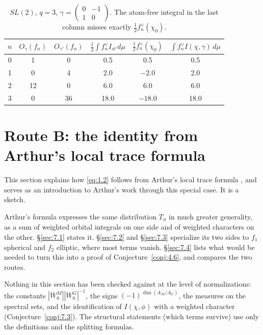 \documentclass[12pt,letterpaper]{article}
\numberwithin{equation}{section}
\theoremstyle{plain}
\theoremstyle{remark}
\theoremstyle{plain}
\theoremstyle{definition}
\theoremstyle{remark}
\theoremstyle{remark}
\begin{document}
\begin{table}[h]
\centering
\begin{tabular}{c|cc|ccc}
\toprule
$n$ & $O_\gamma(f_n)$ & $O_{\gamma'}(f_n)$ & $\frac12\int f_n^\vee I_{st}\,d\mu$ & $\frac12f_n^\vee(\chi_0)$ & $\int f_n^\vee I(\chi,\gamma)\,d\mu$\\
\midrule
0 & 1 & 0 & 0.5 & 0.5 & 0.5\\
1 & 0 & 4 & 2.0 & $-2.0$ & 2.0\\
2 & 12 & 0 & 6.0 & 6.0 & 6.0\\
3 & 0 & 36 & 18.0 & $-18.0$ & 18.0\\
\bottomrule
\end{tabular}
\caption{$SL(2)$, $q=3$, $\gamma=\left(\begin{smallmatrix}0&-1\\1&0\end{smallmatrix}\right)$. The atom-free integral in the last column misses exactly $\frac12f_n^\vee(\chi_0)$.}
\end{table}

\section{Route B: the identity from Arthur's local trace formula}\label{sec:7}

This section explains how \eqref{eq:1.2} follows from Arthur's local trace formula \cite{Ar91}, and serves as an introduction to Arthur's work through this special case. It is a sketch.

Arthur's formula expresses the same distribution $T_\phi$ in much greater generality, as a sum of weighted orbital integrals on one side and of weighted characters on the other. \S\ref{sec:7.1} states it. \S\ref{sec:7.2} and \S\ref{sec:7.3} specialize its two sides to $f_1$ spherical and $f_2$ elliptic, where most terms vanish. \S\ref{sec:7.4} lists what would be needed to turn this into a proof of Conjecture~\ref{conj:4.6}, and compares the two routes.

\begin{rem26}[\S\ref{sec:7}]\label{r:routeB}
Nothing in this section has been checked against \cite{Ar91,Ar93} at the level of normalizations: the constants $|W_0^M||W_0^G|^{-1}$, the signs $(-1)^{\dim(A_M/A_G)}$, the measures on the spectral sets, and the identification of $I(\chi,\phi)$ with a weighted character (Conjecture~\ref{conj:7.3}). The structural statements (which terms survive) use only the definitions and the splitting formulas.
\end{rem26}
\end{document}
